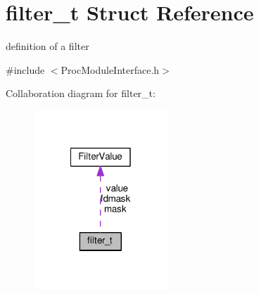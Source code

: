 \hypertarget{structfilter__t}{}\section{filter\+\_\+t Struct Reference}
\label{structfilter__t}


definition of a filter  




{\ttfamily \#include $<$Proc\+Module\+Interface.\+h$>$}



Collaboration diagram for filter\+\_\+t\+:
\nopagebreak
\begin{figure}[H]
\begin{center}
\leavevmode
\includegraphics[width=144pt]{structfilter__t__coll__graph}
\end{center}
\end{figure}
